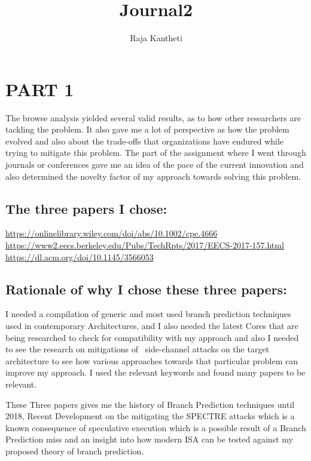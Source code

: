 \documentclass{article}
\title{Journal2}
\author{Raja Kantheti}
\begin{document}
\maketitle

\section{PART 1}
The browse analysis yielded several valid results, as to how other researchers are tackling the problem. It also gave me a lot of perspective as how the problem evolved and also about the trade-offs that organizations have endured while trying to mitigate this problem. The part of the assignment where I went through journals or conferences gave me an idea of the pace of the current innovation and also determined the novelty factor of my approach towards solving this problem.

\subsection{The three papers I chose:}
\url{https://onlinelibrary.wiley.com/doi/abs/10.1002/cpe.4666}\\
\url{https://www2.eecs.berkeley.edu/Pubs/TechRpts/2017/EECS-2017-157.html}\\
\url{https://dl.acm.org/doi/10.1145/3566053}

\subsection{Rationale of why I chose these three papers:}

I needed a compilation of generic and most used branch prediction techniques used in contemporary Architectures, and I also needed the latest Cores that are being researched to check for compatibility with my approach and also I needed to see the research on mitigations of  side-channel attacks on the target architecture to see how various approaches towards that particular problem can improve my approach. I used the relevant keywords and found many papers to be relevant.

These Three papers gives me the history of Branch Prediction techniques until 2018, Recent Development on the mitigating the SPECTRE attacks which is a known consequence of speculative execution which is a possible result of a Branch Prediction miss and an insight into how modern ISA can be tested against my proposed theory of branch prediction.
\end{document}
